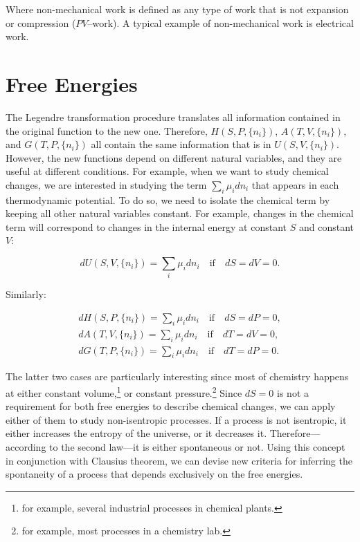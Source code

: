 \documentclass[
  9pt,
]{extbook}
\theoremstyle{definition}
\theoremstyle{definition}
\theoremstyle{definition}
\theoremstyle{definition}
\theoremstyle{remark}
\begin{document}
Where non-mechanical work is defined as any type of work that is not expansion or compression (\(PV\)--work). A typical example of non-mechanical work is electrical work.

\section{Free Energies}\label{freeenergies}

The Legendre transformation procedure translates all information contained in the original function to the new one. Therefore, \(H(S,P,\{n_i\})\), \(A(T,V,\{n_i\})\), and \(G(T,P,\{n_i\})\) all contain the same information that is in \(U(S,V,\{n_i\})\). However, the new functions depend on different natural variables, and they are useful at different conditions. For example, when we want to study chemical changes, we are interested in studying the term \(\sum_i\mu_i dn_i\) that appears in each thermodynamic potential. To do so, we need to isolate the chemical term by keeping all other natural variables constant. For example, changes in the chemical term will correspond to changes in the internal energy at constant \(S\) and constant \(V\):

\begin{equation}
dU(S,V,\{n_i\}) = \sum_i\mu_i dn_i \quad \text{if} \quad dS=dV=0.
\label{eq:duchem}
\end{equation}

Similarly:

\begin{equation}
\begin{aligned}
dH(S,P,\{n_i\}) = \sum_i\mu_i dn_i \quad \text{if} \quad dS=dP=0, \\
dA(T,V,\{n_i\}) = \sum_i\mu_i dn_i \quad \text{if} \quad dT=dV=0, \\
dG(T,P,\{n_i\}) = \sum_i\mu_i dn_i \quad \text{if} \quad dT=dP=0.
\end{aligned}
\label{eq:dhagchem}
\end{equation}

The latter two cases are particularly interesting since most of chemistry happens at either constant volume,\footnote{for example, several industrial processes in chemical plants.} or constant pressure.\footnote{for example, most processes in a chemistry lab.} Since \(dS=0\) is not a requirement for both free energies to describe chemical changes, we can apply either of them to study non-isentropic processes. If a process is not isentropic, it either increases the entropy of the universe, or it decreases it. Therefore---according to the second law---it is either spontaneous or not. Using this concept in conjunction with Clausius theorem, we can devise new criteria for inferring the spontaneity of a process that depends exclusively on the free energies.
\end{document}
